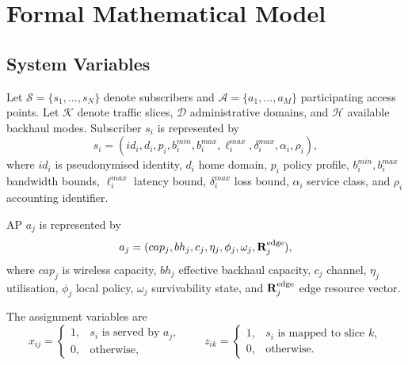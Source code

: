 \chapter{Formal Mathematical Model}
\label{ch:math}

\section{System Variables}
\label{sec:sysvars}

Let $\mathcal{S}=\{s_1,\ldots,s_N\}$ denote subscribers and
$\mathcal{A}=\{a_1,\ldots,a_M\}$ participating access points. Let
$\mathcal{K}$ denote traffic slices, $\mathcal{D}$ administrative domains,
and $\mathcal{H}$ available backhaul modes. Subscriber $s_i$ is represented by
\begin{equation}
  s_i=(id_i,d_i,p_i,b_i^{min},b_i^{max},\ell_i^{max},\delta_i^{max},\alpha_i,\rho_i),
  \label{eq:subscriber-vector}
\end{equation}
where $id_i$ is pseudonymised identity, $d_i$ home domain, $p_i$ policy profile,
$b_i^{min},b_i^{max}$ bandwidth bounds, $\ell_i^{max}$ latency bound,
$\delta_i^{max}$ loss bound, $\alpha_i$ service class, and $\rho_i$ accounting
identifier.

AP $a_j$ is represented by
\begin{equation}
  a_j=(cap_j,bh_j,c_j,\eta_j,\phi_j,\omega_j,\mathbf{R}^{\mathrm{edge}}_j),
  \label{eq:ap-vector}
\end{equation}
where $cap_j$ is wireless capacity, $bh_j$ effective backhaul capacity,
$c_j$ channel, $\eta_j$ utilisation, $\phi_j$ local policy, $\omega_j$
survivability state, and $\mathbf{R}^{\mathrm{edge}}_j$ edge resource vector.

The assignment variables are
\begin{equation}
  x_{ij}=
  \begin{cases}
    1, & s_i\text{ is served by }a_j,\\
    0, & \text{otherwise,}
  \end{cases}
  \qquad
  z_{ik}=
  \begin{cases}
    1, & s_i\text{ is mapped to slice }k,\\
    0, & \text{otherwise.}
  \end{cases}
  \label{eq:assignment-vars}
\end{equation}


